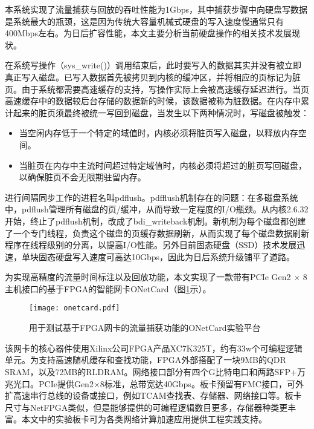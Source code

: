 本系统实现了流量捕获与回放的吞吐性能为1Gbps，其中捕获步骤中向硬盘写数据是系统最大的瓶颈，这是因为传统大容量机械式硬盘的写入速度慢通常只有400Mbps左右。为日后扩容性能，本文主要分析当前硬盘操作的相关技术发展现状。

在系统写操作（sys\_write()）调用结束后，此时要写入的数据其实并没有被立即真正写入磁盘。已写入数据首先被拷贝到内核的缓冲区，并将相应的页标记为脏页。由于系统都需要高速缓存的支持，写操作实际上会被高速缓存延迟进行。当页高速缓存中的数据较后台存储的数据新的时候，该数据被称为脏数据。在内存中累计起来的脏页须最终被统一写回到磁盘，当发生以下两种情况时，写磁盘被触发：

\begin{itemize}
	\item 当空闲内存低于一个特定的域值时，内核必须将脏页写入磁盘，以释放内存空间。
	\item 当脏页在内存中主流时间超过特定域值时，内核必须将超过的脏页写回磁盘，以确保脏页不会无限期驻留内存。
\end{itemize}

进行间隔同步工作的进程名叫pdflush。pdfflush机制存在的问题：在多磁盘系统中，pdflush管理所有磁盘的页/缓冲，从而导致一定程度的I/O瓶颈。从内核2.6.32开始，终止了pdflush机制，改成了bdi\_writeback机制。新机制为每个磁盘都创建了一个专门线程，负责这个磁盘的页缓存数据刷新，从而实现了每个磁盘数据刷新程序在线程级别的分离，以提高I/O性能。另外目前固态硬盘（SSD）技术发展迅速，单块固态硬盘写入速度可高达10Gbps，因此为日后系统升级铺平了道路。

\label{chap362}

为实现高精度的流量时间标注以及回放功能，本文实现了一款带有PCIe Gen2 $ \times $ 8主机接口的基于FPGA的智能网卡ONetCard（图\ref{fig:onetcard}示）。

\begin{figure}[!ht]
	\centering 
	\vspace{-1.5mm}
	\texttt{[image: onetcard.pdf]}
	\caption{用于测试基于FPGA网卡的流量捕获功能的ONetCard实验平台} \label{fig:onetcard}
\end{figure}

该网卡的核心器件使用Xilinx公司FPGA产品XC7K325T，约有33w个可编程逻辑单元。为支持高速随机缓存和查找功能，FPGA外部搭配了一块9MB的QDR SRAM，以及72MB的RLDRAM。网络接口部分有四个G比特电口和两路SFP+万兆光口。PCIe提供Gen2$\times$8标准，总带宽达40Gbps。板卡预留有FMC接口，可外扩高速串行总线的设备或接口，例如TCAM查找表、存储器、网络接口等。板卡尺寸与NetFPGA类似，但是能够提供的可编程逻辑数目更多，存储器种类更丰富。本文中的实验板卡可为各类网络计算加速应用提供工程实践支持。

